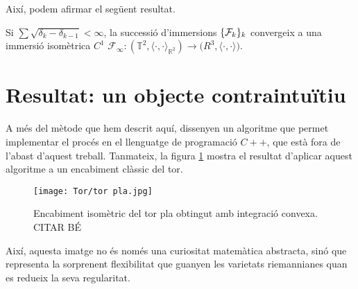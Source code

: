 Així, podem afirmar el següent resultat.
\begin{teo}
    Si $\sum\sqrt{\delta_k-\delta_{k-1}}<\infty$, la successió d'immersions $\{\mathcal F_k\}_k$ convergeix a una immersió isomètrica $C^1$ $\mathcal F_\infty:(\mathbb T^2, \langle\cdot, \cdot\rangle_{\mathbb R^2})\to\mathbb (R^3, \langle\cdot, \cdot\rangle)$.
\end{teo}

\section{Resultat: un objecte contraintuïtiu}
A més del mètode que hem descrit aquí, \cite{borrelli2013} dissenyen un algoritme que permet implementar el procés en el llenguatge de programació $C++$, que està fora de l'abast d'aquest treball. Tanmateix, la figura \ref{fig:tor_pl} mostra el resultat d'aplicar aquest algoritme a un encabiment clàssic del tor.
\begin{figure}[h!]
    \centering
    \texttt{[image: Tor/tor pla.jpg]}
    \caption{Encabiment isomètric del tor pla obtingut amb integració convexa.{\color{blue} CITAR BÉ}}
    \label{fig:tor_pl} 
\end{figure}

Així, aquesta imatge no és només una curiositat matemàtica abstracta, sinó que representa la sorprenent flexibilitat que guanyen les varietats riemannianes quan es redueix la seva regularitat.